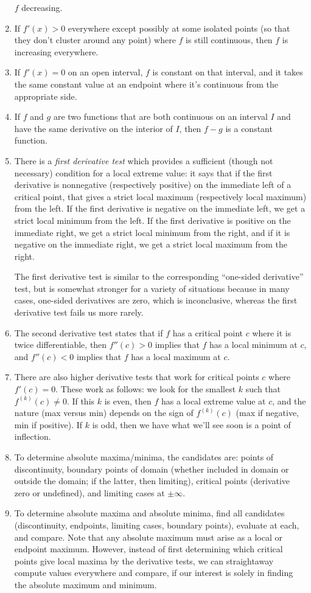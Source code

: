 \documentclass{amsart}
\begin{document}
\begin{enumerate}
  $f$ decreasing.
\item If $f'(x) > 0$ everywhere except possibly at some isolated
  points (so that they don't cluster around any point) where $f$ is
  still continuous, then $f$ is increasing everywhere.
\item If $f'(x) = 0$ on an open interval, $f$ is constant on that
  interval, and it takes the same constant value at an endpoint where
  it's continuous from the appropriate side.
\item If $f$ and $g$ are two functions that are both continuous on an
  interval $I$ and have the same derivative on the interior of $I$,
  then $f - g$ is a constant function.
\item There is a {\em first derivative test} which provides a
  sufficient (though not necessary) condition for a local extreme
  value: it says that if the first derivative is nonnegative
  (respectively positive) on the immediate left of a critical point,
  that gives a strict local maximum (respectively local maximum) from
  the left. If the first derivative is negative on the immediate left,
  we get a strict local minimum from the left. If the first derivative
  is positive on the immediate right, we get a strict local minimum
  from the right, and if it is negative on the immediate right, we get
  a strict local maximum from the right.

  The first derivative test is similar to the corresponding
  ``one-sided derivative'' test, but is somewhat stronger for a
  variety of situations because in many cases, one-sided derivatives
  are zero, which is inconclusive, whereas the first derivative test
  fails us more rarely.
\item The second derivative test states that if $f$ has a critical
  point $c$ where it is twice differentiable, then $f''(c) > 0$
  implies that $f$ has a local minimum at $c$, and $f''(c) < 0$
  implies that $f$ has a local maximum at $c$.
\item There are also higher derivative tests that work for critical
  points $c$ where $f'(c) = 0$. These work as follows: we look for the
  smallest $k$ such that $f^{(k)}(c) \ne 0$. If this $k$ is even, then
  $f$ has a local extreme value at $c$, and the nature (max versus
  min) depends on the sign of $f^{(k)}(c)$ (max if negative, min if
  positive). If $k$ is odd, then we have what we'll see soon is a
  point of inflection.
\item To determine absolute maxima/minima, the candidates are: points
  of discontinuity, boundary points of domain (whether included in
  domain or outside the domain; if the latter, then limiting),
  critical points (derivative zero or undefined), and limiting cases
  at $\pm \infty$.
\item To determine absolute maxima and absolute minima, find all
  candidates (discontinuity, endpoints, limiting cases, boundary
  points), evaluate at each, and compare. Note that any absolute
  maximum must arise as a local or endpoint maximum. However, instead
  of first determining which critical points give local maxima by the
  derivative tests, we can straightaway compute values everywhere and
  compare, if our interest is solely in finding the absolute maximum
  and minimum.


\end{enumerate}
\end{document}
